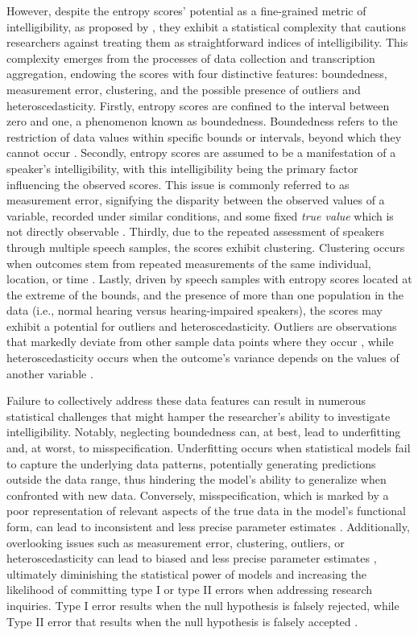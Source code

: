 \documentclass[
  authoryear,
  preprint,
  1p]{elsarticle}
\begin{document}
However, despite the entropy scores' potential as a fine-grained metric
of intelligibility, as proposed by \citet{Boonen_et_al_2023}, they
exhibit a statistical complexity that cautions researchers against
treating them as straightforward indices of intelligibility. This
complexity emerges from the processes of data collection and
transcription aggregation, endowing the scores with four distinctive
features: boundedness, measurement error, clustering, and the possible
presence of outliers and heteroscedasticity. Firstly, entropy scores are
confined to the interval between zero and one, a phenomenon known as
boundedness. Boundedness refers to the restriction of data values within
specific bounds or intervals, beyond which they cannot occur
\citep{Lebl_2022}. Secondly, entropy scores are assumed to be a
manifestation of a speaker's intelligibility, with this intelligibility
being the primary factor influencing the observed scores. This issue is
commonly referred to as measurement error, signifying the disparity
between the observed values of a variable, recorded under similar
conditions, and some fixed \emph{true value} which is not directly
observable \citep{Everitt_et_al_2010}. Thirdly, due to the repeated
assessment of speakers through multiple speech samples, the scores
exhibit clustering. Clustering occurs when outcomes stem from repeated
measurements of the same individual, location, or time
\citep{McElreath_2020}. Lastly, driven by speech samples with entropy
scores located at the extreme of the bounds, and the presence of more
than one population in the data (i.e., normal hearing versus
hearing-impaired speakers), the scores may exhibit a potential for
outliers and heteroscedasticity. Outliers are observations that markedly
deviate from other sample data points where they occur
\citep{Grubbs_1969}, while heteroscedasticity occurs when the outcome's
variance depends on the values of another variable
\citep{Everitt_et_al_2010}.

Failure to collectively address these data features can result in
numerous statistical challenges that might hamper the researcher's
ability to investigate intelligibility. Notably, neglecting boundedness
can, at best, lead to underfitting and, at worst, to misspecification.
Underfitting occurs when statistical models fail to capture the
underlying data patterns, potentially generating predictions outside the
data range, thus hindering the model's ability to generalize when
confronted with new data. Conversely, misspecification, which is marked
by a poor representation of relevant aspects of the true data in the
model's functional form, can lead to inconsistent and less precise
parameter estimates \citep{Everitt_et_al_2010}. Additionally,
overlooking issues such as measurement error, clustering, outliers, or
heteroscedasticity can lead to biased and less precise parameter
estimates \citep{McElreath_2020}, ultimately diminishing the statistical
power of models and increasing the likelihood of committing type I or
type II errors when addressing research inquiries. Type I error results
when the null hypothesis is falsely rejected, while Type II error that
results when the null hypothesis is falsely accepted
\citep{Everitt_et_al_2010}.
\end{document}
